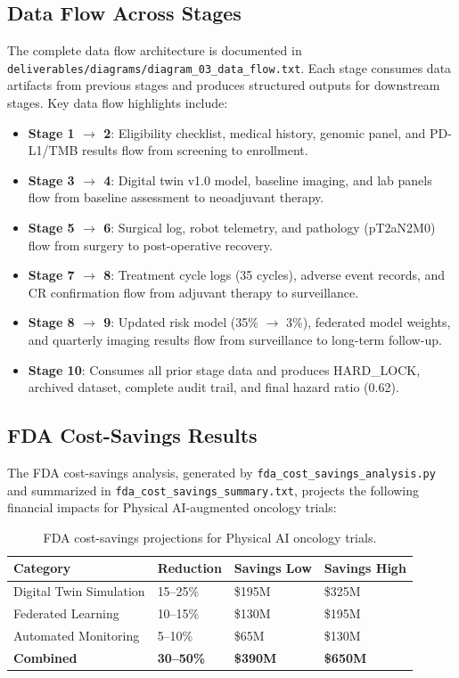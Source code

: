 \subsection{Data Flow Across Stages}

The complete data flow architecture is documented in \texttt{deliverables/diagrams/diagram\_03\_data\_flow.txt}. Each stage consumes data artifacts from previous stages and produces structured outputs for downstream stages. Key data flow highlights include:

\begin{itemize}[leftmargin=*]
\item \textbf{Stage 1 $\rightarrow$ 2}: Eligibility checklist, medical history, genomic panel, and PD-L1/TMB results flow from screening to enrollment.
\item \textbf{Stage 3 $\rightarrow$ 4}: Digital twin v1.0 model, baseline imaging, and lab panels flow from baseline assessment to neoadjuvant therapy.
\item \textbf{Stage 5 $\rightarrow$ 6}: Surgical log, robot telemetry, and pathology (pT2aN2M0) flow from surgery to post-operative recovery.
\item \textbf{Stage 7 $\rightarrow$ 8}: Treatment cycle logs (35 cycles), adverse event records, and CR confirmation flow from adjuvant therapy to surveillance.
\item \textbf{Stage 8 $\rightarrow$ 9}: Updated risk model (35\% $\rightarrow$ 3\%), federated model weights, and quarterly imaging results flow from surveillance to long-term follow-up.
\item \textbf{Stage 10}: Consumes all prior stage data and produces HARD\_LOCK, archived dataset, complete audit trail, and final hazard ratio (0.62).
\end{itemize}

\subsection{FDA Cost-Savings Results}

The FDA cost-savings analysis, generated by \texttt{fda\_cost\_savings\_analysis.py} and summarized in \texttt{fda\_cost\_savings\_summary.txt}, projects the following financial impacts for Physical AI-augmented oncology trials:

\begin{table}[H]
\centering
\caption{FDA cost-savings projections for Physical AI oncology trials.}
\label{tab:cost-savings}
\small
\begin{tabularx}{\textwidth}{@{}L{4cm}R{2cm}R{2cm}R{2cm}@{}}
\toprule
\textbf{Category} & \textbf{Reduction} & \textbf{Savings Low} & \textbf{Savings High} \\
\midrule
Digital Twin Simulation & 15--25\% & \$195M & \$325M \\
Federated Learning & 10--15\% & \$130M & \$195M \\
Automated Monitoring & 5--10\% & \$65M & \$130M \\
\midrule
\textbf{Combined} & \textbf{30--50\%} & \textbf{\$390M} & \textbf{\$650M} \\
\bottomrule
\end{tabularx}
\end{table}

